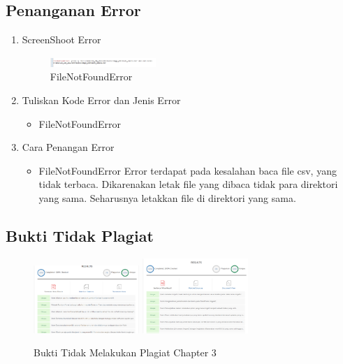 \subsection{Penanganan Error}
\begin{enumerate}
	\item ScreenShoot Error
	\begin{figure}[H]
		\includegraphics[width=4cm]{figures/1174017/3/error/error.PNG}
		\centering
		\caption{FileNotFoundError}
	\end{figure}
	\item Tuliskan Kode Error dan Jenis Error
	\begin{itemize}
		\item FileNotFoundError
	\end{itemize}
	\item Cara Penangan Error
	\begin{itemize}
		\item FileNotFoundError
		\hfill\break
		Error terdapat pada kesalahan baca file csv, yang tidak terbaca. Dikarenakan letak file yang dibaca tidak para direktori yang sama. Seharusnya letakkan file di direktori yang sama. 
	\end{itemize}
\end{enumerate}

\subsection{Bukti Tidak Plagiat}
\begin{figure}[H]
\centering
	\includegraphics[width=4cm]{figures/1174017/3/buktiplagiat/1.PNG}
	\includegraphics[width=4cm]{figures/1174017/3/buktiplagiat/2.PNG}
	\caption{Bukti Tidak Melakukan Plagiat Chapter 3}
\end{figure}

